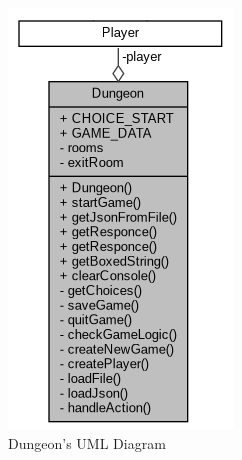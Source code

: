 \documentclass{article}
\begin{document}
    \begin{figure}
        \begin{center}
            \begin{minipage}[c]{0.4\linewidth}
                \begin{center}
                \includegraphics[width=0.7\linewidth]{dungeon_uml}
                \end{center}
                \caption{Dungeon's UML Diagram}
            \end{minipage}
            \text{     }
            \begin{minipage}[c]{0.4\linewidth}
                \begin{center}

\end{center}
\end{minipage}
\end{center}
\end{figure}
\end{document}
